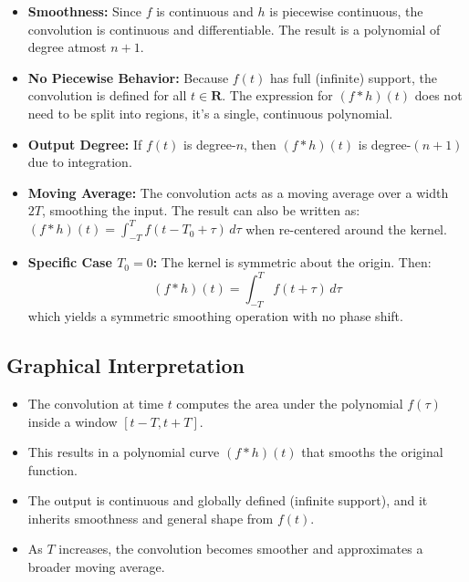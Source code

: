 \documentclass[12pt,a4paper]{report}
\begin{document}
\begin{itemize}
    \item \textbf{Smoothness:} Since $f$ is continuous and $h$ is piecewise continuous, the convolution is continuous and differentiable. The result is a polynomial of degree atmost $n+1$.
    
    \item \textbf{No Piecewise Behavior:} Because $f(t)$ has full (infinite) support, the convolution is defined for all $t \in \mathbf{R}$. The expression for $(f * h)(t)$ does not need to be split into regions, it’s a single, continuous polynomial.
    
    \item \textbf{Output Degree:} If $f(t)$ is degree-$n$, then $(f*h)(t)$ is degree-$(n+1)$ due to integration.
    
    \item \textbf{Moving Average:} The convolution acts as a moving average over a width $2T$, smoothing the input. The result can also be written as:
    $(f * h)(t) = \int_{-T}^{T} f(t - T_0 + \tau)\, d\tau$
    when re-centered around the kernel.
    
    \item \textbf{Specific Case $T_0 = 0$:} The kernel is symmetric about the origin. Then:
    \[
    (f * h)(t) = \int_{-T}^{T} f(t + \tau)\, d\tau
    \]
    which yields a symmetric smoothing operation with no phase shift.
\end{itemize}

\subsection{Graphical Interpretation}

\begin{itemize}
    \item The convolution at time $t$ computes the area under the polynomial $f(\tau)$ inside a window $[t - T, t + T]$.
    
    \item This results in a polynomial curve $(f * h)(t)$ that smooths the original function.
    
    \item The output is continuous and globally defined (infinite support), and it inherits smoothness and general shape from $f(t)$.
    
    \item As $T$ increases, the convolution becomes smoother and approximates a broader moving average.
\end{itemize}
\end{document}
